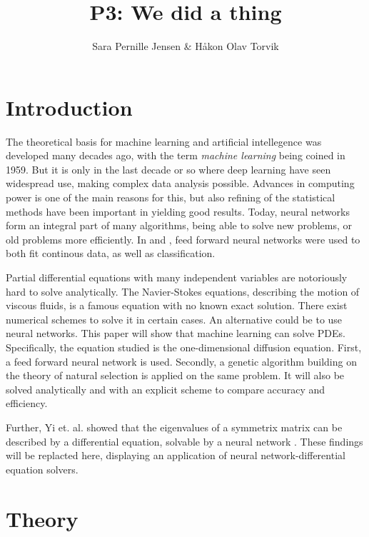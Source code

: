 \documentclass[multicolumn, 12pt]{extarticle}
\author{\Large Sara Pernille Jensen \& Håkon Olav Torvik}
\title{\Huge P3: We did a thing}
\affiliation{\large FYS-STK4155 – Applied Data Analysis and Machine Learning
\\Autumn 2021\\Department of Physics\\University of Oslo\\\\\today}
\begin{document}


\maketitle

\pagestyle{myplain}


\twocolumn
\section{Introduction}

The theoretical basis for machine learning and artificial intellegence was developed many decades ago, with the term \textit{machine learning} being coined in 1959. But it is only in the last decade or so where deep learning have seen widespread use, making complex data analysis possible. Advances in computing power is one of the main reasons for this, but also refining of the statistical methods have been important in yielding good results. Today, neural networks form an integral part of many algorithms, being able to solve new problems, or old problems more efficiently. In \cite{p2S} and \cite{p2HO}, feed forward neural networks were used to both fit continous data, as well as classification.

Partial differential equations with many independent variables are notoriously hard to solve analytically. The Navier-Stokes equations, describing the motion of viscous fluids, is a famous equation with no known exact solution. There exist numerical schemes to solve it in certain cases. An alternative could be to use neural networks. This paper will show that machine learning can solve PDEs. Specifically, the equation studied is the one-dimensional diffusion equation. First, a feed forward neural network is used. Secondly, a genetic algorithm building on the theory of natural selection is applied on the same problem. It will also be solved analytically and with an explicit scheme to compare accuracy and efficiency.

Further, Yi et. al. showed that the eigenvalues of a symmetrix matrix can be described by a differential equation, solvable by a neural network \cite{symmetric}. These findings will be replacted here, displaying an application of neural network-differential equation solvers.


\section{Theory}
\end{document}
